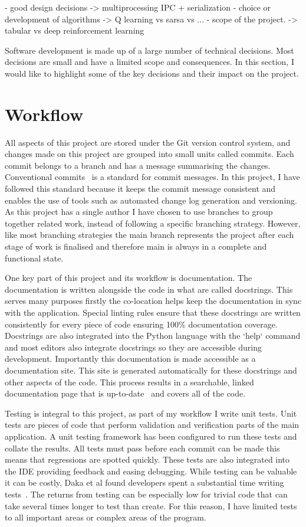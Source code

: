 \documentclass[]{final_report}
\begin{document}
 - good design decisions -> multiprocessing IPC + serialization
 - choice or development of algorithms -> Q learning vs sarsa vs ... 
 - scope of the project. -> tabular vs deep reinforcement learning


Software development is made up of a large number of technical decisions. Most decisions are small and have a limited scope and consequences. In this section, I would like to highlight some of the key decisions and their impact on the project. 


\pagebreak
\section{Workflow}


All aspects of this project are stored under the Git version control system, and changes made on this project are grouped into small units called commits. Each commit belongs to a branch and has a message summarising the changes. Conventional commits~\cite{conventionalCommitsOnline} is a standard for commit messages. In this project, I have followed this standard because it keeps the commit message consistent and enables the use of tools such as automated change log generation and versioning. As this project has a single author I have chosen to use branches to group together related work, instead of following a specific branching strategy. However, like most branching strategies the main branch represents the project after each stage of work is finalised and therefore main is always in a complete and functional state. 

One key part of this project and its workflow is documentation. The documentation is written alongside the code in what are called docstrings. This serves many purposes firstly the co-location helps keep the documentation in sync with the application. Special linting rules ensure that these docstrings are written consistently for every piece of code ensuring 100\% documentation coverage. Docstrings are also integrated into the Python language with the `help` command and most editors also integrate docstrings so they are accessible during development. Importantly this documentation is made accessible as a documentation site. This site is generated automatically for these docstrings and other aspects of the code. This process results in a searchable, linked documentation page that is up-to-date~\cite{pythonAutoDoc} and covers all of the code. 

Testing is integral to this project, as part of my workflow I write unit tests. Unit tests are pieces of code that perform validation and verification parts of the main application. A unit testing framework has been configured to run these tests and collate the results. All tests must pass before each commit can be made this means that regressions are spotted quickly. These tests are also integrated into the IDE providing feedback and easing debugging.  While testing can be valuable it can be costly, Daka et al found developers spent a substantial time writing tests~\cite{unitTestingSurvey}. The returns from testing can be especially low for trivial code that can take several times longer to test than create. For this reason, I have limited tests to all important areas or complex areas of the program.  
\end{document}
